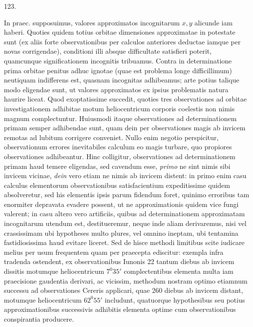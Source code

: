 \par{}\medskip
\begin{center}\hypertarget{native-170-article123}{}123.\end{center}
In praec. supposuimus, valores approximatos incognitarum $x,y$ alicunde
iam haberi. Quoties quidem totius orbitae dimensiones approximatae in potestate
sunt (ex aliis forte observationibus per calculos anteriores deductae
iamque per novas corrigendae), conditioni illi absque difficultate satisfieri poterit,
quamcunque significationem incognitis tribuamus. Contra in determinatione
prima orbitae penitus adhuc ignotae (quae est problema longe difficillimum)
neutiquam indifferens est, quasnam incognitas adhibeamus; arte potius
talique modo eligendae sunt, ut valores approximatos ex ipsius problematis
natura haurire liceat. Quod exoptatissime succedit, quoties tres observationes
ad orbitae investigationem adhibitae motum heliocentricum corporis coelestis
non nimis magnum complectuntur. Huiusmodi itaque observationes ad determinationem
primam semper adhibendae sunt, quam dein per observationes
magis ab invicem remotas ad lubitum corrigere conveniet. Nullo enim negotio
perspicitur, observationum errores inevitabiles calculum eo magis turbare,
quo propiores observationes adhibeantur. Hinc colligitur, observationes
ad determinationem primam haud temere eligendas, sed cavendum esse, \emph{primo}
ne sint nimis sibi invicem vicinae, \emph{dein} vero etiam ne nimis ab invicem distent:
in primo enim casu calculus elementorum observationibus satisfacientium expeditissime
quidem absolveretur, sed his elementis ipsis parum fidendum foret,
quinimo erroribus tam enormiter depravata evadere possent, ut ne approximationis
quidem vice fungi valerent; in casu altero vero artificiis, quibus ad determinationem
approximatam incognitarum utendum est, destitueremur, neque
inde aliam derivaremus, nisi vel crassissimam ubi hypotheses multo plures, vel
omnino ineptam, ubi tentamina fastidiosissima haud evitare liceret. Sed de
hisce methodi limitibus scite iudicare melius per usum frequentem quam per
praecepta ediscitur: exempla infra tradenda ostendent, ex observationibus Iunonis
22 tantum diebus ab invicem dissitis motumque heliocentricum $7^0 35'$
complectentibus elementa multa iam praecisione gaudentia derivari, ac vicissim,
methodum nostram optimo etiamnum successu ad observationes Cereris applicari,
quae 260 diebus ab invicem distant, motumque heliocentricum $62^0 55'$
includunt, quatuorque hypothesibus seu potius approximationibus successivis
adhibitis elementa optime cum observationibus conspirantia producere.

